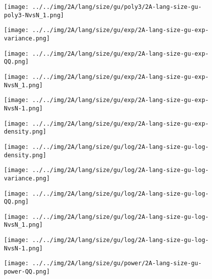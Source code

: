 \begin{figure}[H]
\centering	\texttt{[image: ../../img/2A/lang/size/gu/poly3/2A-lang-size-gu-poly3-NvsN\_1.png]}
\end{figure}
\begin{figure}[H]
\centering	\texttt{[image: ../../img/2A/lang/size/gu/exp/2A-lang-size-gu-exp-variance.png]}
\end{figure}
\begin{figure}[H]
\centering	\texttt{[image: ../../img/2A/lang/size/gu/exp/2A-lang-size-gu-exp-QQ.png]}
\end{figure}
\begin{figure}[H]
\centering	\texttt{[image: ../../img/2A/lang/size/gu/exp/2A-lang-size-gu-exp-NvsN\_1.png]}
\end{figure}
\begin{figure}[H]
\centering	\texttt{[image: ../../img/2A/lang/size/gu/exp/2A-lang-size-gu-exp-NvsN-1.png]}
\end{figure}
\begin{figure}[H]
\centering	\texttt{[image: ../../img/2A/lang/size/gu/exp/2A-lang-size-gu-exp-density.png]}
\end{figure}
\begin{figure}[H]
\centering	\texttt{[image: ../../img/2A/lang/size/gu/log/2A-lang-size-gu-log-density.png]}
\end{figure}
\begin{figure}[H]
\centering	\texttt{[image: ../../img/2A/lang/size/gu/log/2A-lang-size-gu-log-variance.png]}
\end{figure}
\begin{figure}[H]
\centering	\texttt{[image: ../../img/2A/lang/size/gu/log/2A-lang-size-gu-log-QQ.png]}
\end{figure}
\begin{figure}[H]
\centering	\texttt{[image: ../../img/2A/lang/size/gu/log/2A-lang-size-gu-log-NvsN\_1.png]}
\end{figure}
\begin{figure}[H]
\centering	\texttt{[image: ../../img/2A/lang/size/gu/log/2A-lang-size-gu-log-NvsN-1.png]}
\end{figure}
\begin{figure}[H]
\centering	\texttt{[image: ../../img/2A/lang/size/gu/power/2A-lang-size-gu-power-QQ.png]}
\end{figure}
